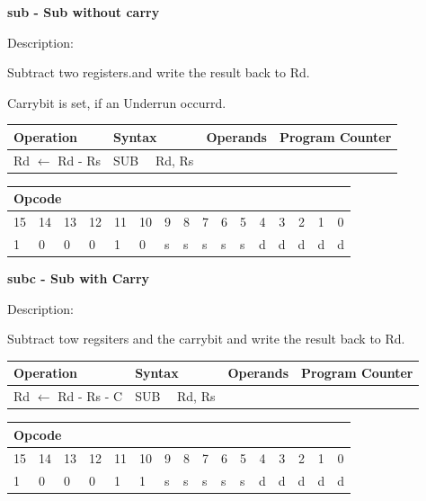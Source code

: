 \documentclass[%
	pdftex,
	a4paper,
	oneside,
	bibtotoc,%
	idxtotoc,%
	bibtotocnumbered,
	halfparskip,%
]{scrbook}
\begin{document}
\bigskip

\textbf{sub - Sub without carry}

Description:

Subtract two registers.and write the result back to Rd.

Carrybit is set, if an Underrun occurrd.

\begin{tabular}{|l|l|l|l|}
\hline
Operation & Syntax & Operands & Program Counter \\ \hline
Rd $\leftarrow $ Rd - Rs & SUB \ \ Rd, Rs &  &  \\ \hline
\end{tabular}

\begin{tabular}{|c|c|c|c|c|c|c|c|c|c|c|c|c|c|c|c|}
\hline
\multicolumn{6}{|l|}{Opcode} & \multicolumn{5}{|l|}{} & \multicolumn{5}{|l|}{
} \\ \hline
15 & 14 & 13 & 12 & 11 & 10 & 9 & 8 & 7 & 6 & 5 & 4 & 3 & 2 & 1 & 0 \\ \hline
\multicolumn{1}{|l|}{1} & \multicolumn{1}{|l|}{0} & \multicolumn{1}{|l|}{0}
& \multicolumn{1}{|l|}{0} & \multicolumn{1}{|l|}{1} & \multicolumn{1}{|l|}{0}
& \multicolumn{1}{|l|}{s} & \multicolumn{1}{|l|}{s} & \multicolumn{1}{|l|}{s}
& \multicolumn{1}{|l|}{s} & \multicolumn{1}{|l|}{s} & \multicolumn{1}{|l|}{d}
& \multicolumn{1}{|l|}{d} & \multicolumn{1}{|l|}{d} & \multicolumn{1}{|l|}{d}
& \multicolumn{1}{|l|}{d} \\ \hline
\end{tabular}

\bigskip

\textbf{subc - Sub with Carry}

Description:

Subtract tow regsiters and the carrybit and write the result back to Rd.

\begin{tabular}{|l|l|l|l|}
\hline
Operation & Syntax & Operands & Program Counter \\ \hline
Rd $\leftarrow $ Rd - Rs - C & SUB \ \ Rd, Rs &  &  \\ \hline
\end{tabular}

\begin{tabular}{|c|c|c|c|c|c|c|c|c|c|c|c|c|c|c|c|}
\hline
\multicolumn{6}{|l|}{Opcode} & \multicolumn{5}{|l|}{} & \multicolumn{5}{|l|}{
} \\ \hline
15 & 14 & 13 & 12 & 11 & 10 & 9 & 8 & 7 & 6 & 5 & 4 & 3 & 2 & 1 & 0 \\ \hline
\multicolumn{1}{|l|}{1} & \multicolumn{1}{|l|}{0} & \multicolumn{1}{|l|}{0}
& \multicolumn{1}{|l|}{0} & \multicolumn{1}{|l|}{1} & \multicolumn{1}{|l|}{1}
& \multicolumn{1}{|l|}{s} & \multicolumn{1}{|l|}{s} & \multicolumn{1}{|l|}{s}
& \multicolumn{1}{|l|}{s} & \multicolumn{1}{|l|}{s} & \multicolumn{1}{|l|}{d}
& \multicolumn{1}{|l|}{d} & \multicolumn{1}{|l|}{d} & \multicolumn{1}{|l|}{d}
& \multicolumn{1}{|l|}{d} \\ \hline
\end{tabular}
\end{document}
